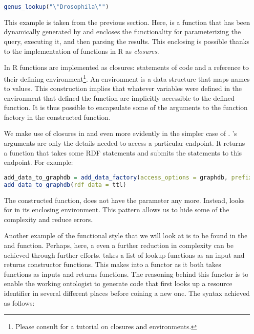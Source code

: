 \begin{lstlisting}[language=R,
style=customr]
genus_lookup("\"Drosophila\"")
\end{lstlisting}

This example is taken from the previous section. Here,  is a function that has been dynamically generated by  and encloses the functionality for parameterizing the query, executing it, and then parsing the results. This enclosing is possible thanks to the implementation of functions in R as \emph{closures}.

In R functions are implemented as closures: statements of code and a reference to their defining environment\footnote{Please consult \cite{wickham_advanced_2015} for a tutorial on closures and environments.}. An environment is a data structure that maps names to values. This construction implies that whatever variables were defined in the environment that defined the function are implicitly accessible to the defined function. It is thus possible to encapsulate some of the arguments to the function factory in the constructed function.

We make use of closures in  and even more evidently in the simpler case of . 's arguments are only the details needed to access a particular endpoint. It returns a function that takes some RDF statements and submits the statements to this endpoint. For example:

\begin{lstlisting}[language=R,
style=customr]
add_data_to_graphdb = add_data_factory(access_options = graphdb, prefixes = prefixes)
add_data_to_graphdb(rdf_data = ttl)
\end{lstlisting}

The constructed function,  does not have the parameter  any more. Instead,  looks for  in its enclosing environment. This pattern allows us to hide some of the complexity and reduce errors.

Another example of the functional style that we will look at is to be found in the  and  function. Perhaps, here, a even a further reduction in complexity can be achieved through further efforts.  takes a list of lookup functions as an input and returns constructor functions. This makes  into a functor as it both takes functions as inputs and returns functions. The reasoning behind this functor is to enable the working ontologist to generate code that first looks up a resource identifier in several different places before coining a new one. The syntax achieved as follows:

